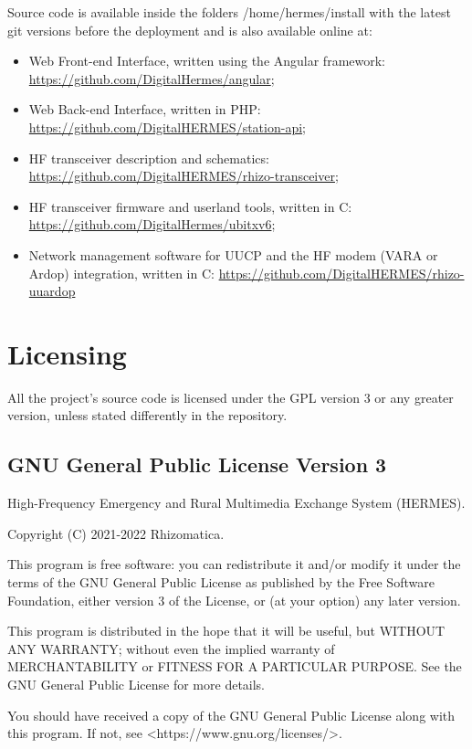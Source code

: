 \documentclass[11pt,a4paper]{article}
\begin{document}
    Source code is available inside the folders /home/hermes/install with the latest git versions before the deployment and is also available online at:
\begin{itemize}
    \item Web Front-end Interface, written using the Angular framework: \url{https://github.com/DigitalHermes/angular};
    \item Web Back-end Interface, written in PHP: \url{https://github.com/DigitalHERMES/station-api}; 
    \item HF transceiver description and schematics: \url{https://github.com/DigitalHERMES/rhizo-transceiver};
    \item HF transceiver firmware and userland tools, written in C:
    \url{https://github.com/DigitalHermes/ubitxv6};
    \item Network management software for UUCP and the HF modem (VARA or Ardop) integration, written in C:
    \url{https://github.com/DigitalHERMES/rhizo-uuardop}
\end{itemize}


\section{Licensing}
\label{apx_license}

    All the project's source code is licensed under the GPL version 3 or any greater version, unless stated differently in the repository.

\subsection{GNU General Public License Version 3}

    High-Frequency Emergency and Rural Multimedia Exchange System (HERMES).

    Copyright (C) 2021-2022 Rhizomatica.
\newline

    This program is free software: you can redistribute it and/or modify
    it under the terms of the GNU General Public License as published by
    the Free Software Foundation, either version 3 of the License, or
    (at your option) any later version.

    This program is distributed in the hope that it will be useful,
    but WITHOUT ANY WARRANTY; without even the implied warranty of
    MERCHANTABILITY or FITNESS FOR A PARTICULAR PURPOSE.  See the
    GNU General Public License for more details.

    You should have received a copy of the GNU General Public License
    along with this program.  If not, see <https://www.gnu.org/licenses/>.
    
\end{document}
